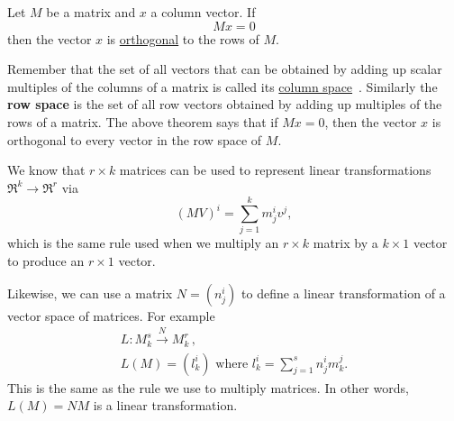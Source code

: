 \begin{theorem}
Let $M$ be a matrix and $x$ a column vector. If 
\[
Mx=0
\]
then the vector $x$ is \hyperlink{orthog}{orthogonal} to the rows of $M$.
\end{theorem}

\begin{remark}
Remember that the set of all vectors that can be obtained by adding up scalar multiples of the columns of a matrix is called its \hyperlink{column space}{column space}~. Similarly the {\bfseries row space} is the set of all row vectors obtained by adding up multiples of the rows of a matrix. The above theorem says that if $Mx=0$, then the vector $x$ is orthogonal to every vector in the row space of $M$.
\end{remark}



We know that $r\times k$ matrices can be used to represent linear transformations 
$ \Re^k \rightarrow \Re^r $
via \[(MV)^i = \sum_{j=1}^{k} m_j^iv^j , \] which is the same rule used when we multiply an $r\times k$ matrix by a $k\times 1$ vector to produce an $r\times1$ vector.

Likewise, we can use a matrix $N=(n^i_j)$ to define a linear transformation of a vector space of matrices. For example
\begin{gather*}
L \colon M^s_k \stackrel{N}{\longrightarrow} M^r_k\, ,\\
L(M)=(l^i_k) \mbox{ where } l^i_k= \sum_{j=1}^{s} n_j^im^j_k.
\end{gather*}
This is the same as the rule we use to multiply matrices. \hypertarget{leftmult}{In other words,} \(L(M)=NM\) is a linear transformation.

